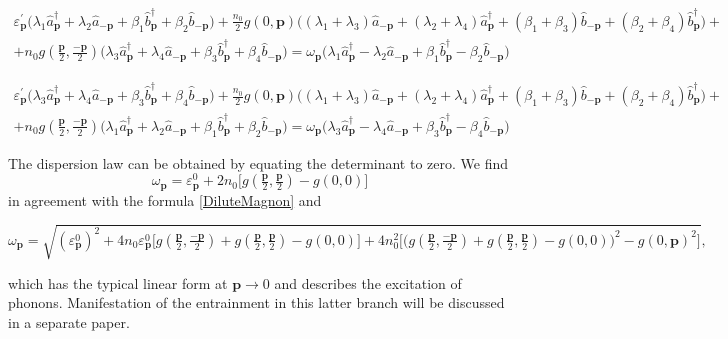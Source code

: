 \documentclass[reprint,superscriptaddress,showpacs,nofootinbib,aps,pra]{revtex4-1}
\begin{document}
\begin{widetext}
\begin{equation*}
\begin{split}
 \varepsilon_{\bm p}^\prime \big( \lambda_1 \hat{a}_{{\bm p}}^\dag + \lambda_2 \hat{a}_{\bm{-p}} +\beta_1\hat{b}_{{\bm p}}^\dag + \beta_2 \hat{b}_{\bm{-p}} \big)  + \frac{n_0}{2}  g(0,{\bm p}) \big(  (\lambda_1 + \lambda_3) \hat{a}_{\bm{-p}} + (\lambda_2 +\lambda_4) \hat{a}_{{\bm p}}^\dag + (\beta_1+\beta_3) \hat{b}_{\bm{-p}} + (\beta_2+\beta_4) \hat{b}_{{\bm p}}^\dag \big) + \\ + n_0 g(\tfrac{{\bm p}}2,\tfrac{\bm{-p}}2) \big( \lambda_3 \hat{a}_{{\bm p}}^\dag + \lambda_4 \hat{a}_{\bm{-p}} +\beta_3 \hat{b}_{{\bm p}}^\dag + \beta_4 \hat{b}_{\bm{-p}} \big) = \omega_{\bm p}\big( \lambda_1 \hat{a}_{{\bm p}}^\dag - \lambda_2 \hat{a}_{\bm{-p}} +\beta_1\hat{b}_{{\bm p}}^\dag - \beta_2 \hat{b}_{\bm{-p}} \big)
\end{split}
\end{equation*}

 
\begin{equation*}
\begin{split}
 \varepsilon_{\bm p}^\prime \big( \lambda_3 \hat{a}_{{\bm p}}^\dag + \lambda_4 \hat{a}_{\bm{-p}} +\beta_3 \hat{b}_{{\bm p}}^\dag + \beta_4 \hat{b}_{\bm{-p}} \big)  + \frac{n_0}{2}  g(0,{\bm p}) \big(  (\lambda_1 + \lambda_3) \hat{a}_{\bm{-p}} + (\lambda_2 +\lambda_4) \hat{a}_{{\bm p}}^\dag + (\beta_1+\beta_3) \hat{b}_{\bm{-p}} + (\beta_2+\beta_4) \hat{b}_{{\bm p}}^\dag \big) + \\ + n_0 g(\tfrac{{\bm p}}2,\tfrac{\bm{-p}}2) \big( \lambda_1 \hat{a}_{{\bm p}}^\dag + \lambda_2 \hat{a}_{\bm{-p}} +\beta_1\hat{b}_{{\bm p}}^\dag + \beta_2 \hat{b}_{\bm{-p}} \big) = \omega_{\bm p}\big( \lambda_3 \hat{a}_{{\bm p}}^\dag - \lambda_4 \hat{a}_{\bm{-p}} +\beta_3 \hat{b}_{{\bm p}}^\dag - \beta_4 \hat{b}_{\bm{-p}} \big)
\end{split}
\end{equation*}
\end{widetext}

The dispersion law can be obtained by equating the determinant to zero. We find
\begin{equation}
\label{gDiluteMagnon}
\omega_{\bm p} = \varepsilon_{\bm p}^0 + 2 n_0 \Big[ g(\tfrac{{\bm p}}2,\tfrac{{\bm p}}2) - g(0,0) \Big]
\end{equation}
in agreement with the formula \eqref{DiluteMagnon} and
\begin{widetext}
\begin{equation}
\label{gDilutePhonon}
\omega_{\bm p} =  \sqrt{(\varepsilon_{\bm p}^0)^2+4 n_0 \varepsilon_{\bm p}^0 
\big[ g(\tfrac{{\bm p}}2,\tfrac{\bm{-p}}2) + g(\tfrac{{\bm p}}2,\tfrac{{\bm p}}2) - g(0,0) \big] + 4 n_0^2 \Big[\big( g(\tfrac{{\bm p}}2,\tfrac{\bm{-p}}2) + g(\tfrac{{\bm p}}2,\tfrac{{\bm p}}2) - g(0,0) \big)^2 - g(0,{\bm p})^2 \Big]}, 
\end{equation}
\end{widetext}
which has the typical linear form at $\bm p\rightarrow 0$ and describes the excitation of phonons. Manifestation of the entrainment in this latter branch will be discussed in a separate paper.
\end{document}
